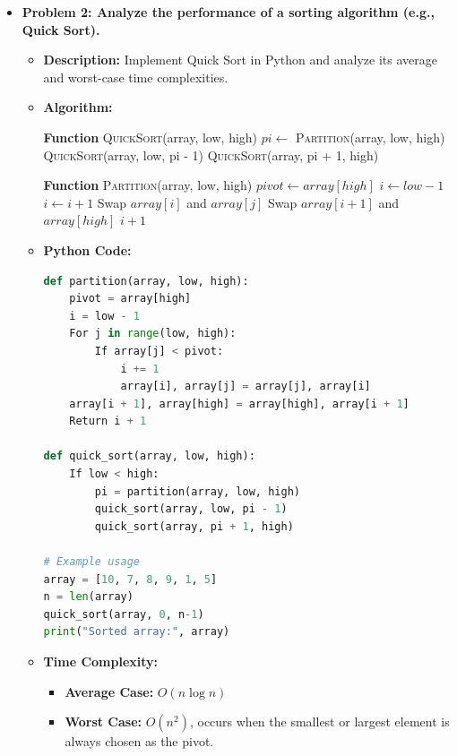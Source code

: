 \documentclass[12pt]{book} %
\begin{document}
\begin{itemize}
    \item \textbf{Problem 2: Analyze the performance of a sorting algorithm (e.g., Quick Sort).}
    \begin{itemize}
        \item \textbf{Description:} Implement Quick Sort in Python and analyze its average and worst-case time complexities.
        \item \textbf{Algorithm:}
        \begin{algorithm}
        \caption{Quick Sort}
        \begin{algorithmic}
            \State \textbf{Function} \textsc{QuickSort}(array, low, high)
                \State $pi \leftarrow$ \textsc{Partition}(array, low, high)
                \State \textsc{QuickSort}(array, low, pi - 1)
                \State \textsc{QuickSort}(array, pi + 1, high)
            \EndIf
        \end{algorithmic}
        \end{algorithm}
        \begin{algorithm}
        \caption{Partition}
        \begin{algorithmic}
            \State \textbf{Function} \textsc{Partition}(array, low, high)
            \State $pivot \leftarrow array[high]$
            \State $i \leftarrow low - 1$
                    \State $i \leftarrow i + 1$
                    \State Swap $array[i]$ and $array[j]$
                \EndIf
            \EndFor
            \State Swap $array[i + 1]$ and $array[high]$
            \Return $i + 1$
        \end{algorithmic}
        \end{algorithm}
        \item \textbf{Python Code:}
        \FloatBarrier
        \begin{lstlisting}[language=Python]
def partition(array, low, high):
    pivot = array[high]
    i = low - 1
    For j in range(low, high):
        If array[j] < pivot:
            i += 1
            array[i], array[j] = array[j], array[i]
    array[i + 1], array[high] = array[high], array[i + 1]
    Return i + 1

def quick_sort(array, low, high):
    If low < high:
        pi = partition(array, low, high)
        quick_sort(array, low, pi - 1)
        quick_sort(array, pi + 1, high)

# Example usage
array = [10, 7, 8, 9, 1, 5]
n = len(array)
quick_sort(array, 0, n-1)
print("Sorted array:", array)
        \end{lstlisting}
        \FloatBarrier
        \item \textbf{Time Complexity:}
        \begin{itemize}
            \item \textbf{Average Case:} $O(n \log n)$
            \item \textbf{Worst Case:} $O(n^2)$, occurs when the smallest or largest element is always chosen as the pivot.
        \end{itemize}
    \end{itemize}


\end{itemize}
\end{document}
